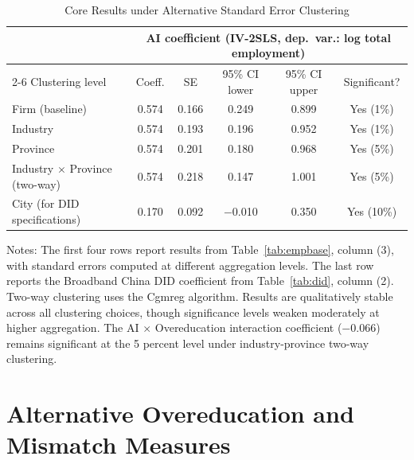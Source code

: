 \documentclass[12pt,a4paper]{article}
\theoremstyle{predstyle}
\theoremstyle{plain}
\begin{document}
\begin{appendices}
\begin{table}[H]
\centering
\caption{Core Results under Alternative Standard Error Clustering}
\label{tab:clustering}
\begin{threeparttable}
\small
\begin{tabular}{lccccc}
\toprule
& \multicolumn{5}{c}{AI coefficient (IV-2SLS, dep.\ var.: log total employment)} \\
\cmidrule{2-6}
Clustering level & Coeff. & SE & 95\% CI lower & 95\% CI upper & Significant? \\
\midrule
Firm (baseline) & 0.574 & 0.166 & 0.249 & 0.899 & Yes (1\%) \\
Industry & 0.574 & 0.193 & 0.196 & 0.952 & Yes (1\%) \\
Province & 0.574 & 0.201 & 0.180 & 0.968 & Yes (5\%) \\
Industry $\times$ Province (two-way) & 0.574 & 0.218 & 0.147 & 1.001 & Yes (5\%) \\
City (for DID specifications) & 0.170 & 0.092 & $-$0.010 & 0.350 & Yes (10\%) \\
\bottomrule
\end{tabular}
\begin{tablenotes}
\footnotesize
\item Notes: The first four rows report results from Table~\ref{tab:empbase}, column (3), with standard errors computed at different aggregation levels. The last row reports the Broadband China DID coefficient from Table~\ref{tab:did}, column (2). Two-way clustering uses the Cgmreg algorithm. Results are qualitatively stable across all clustering choices, though significance levels weaken moderately at higher aggregation. The AI $\times$ Overeducation interaction coefficient (\(-0.066\)) remains significant at the 5 percent level under industry-province two-way clustering.
\end{tablenotes}
\end{threeparttable}
\end{table}

\section{Alternative Overeducation and Mismatch Measures}
\label{app:altmismatch}


\end{appendices}
\end{document}

